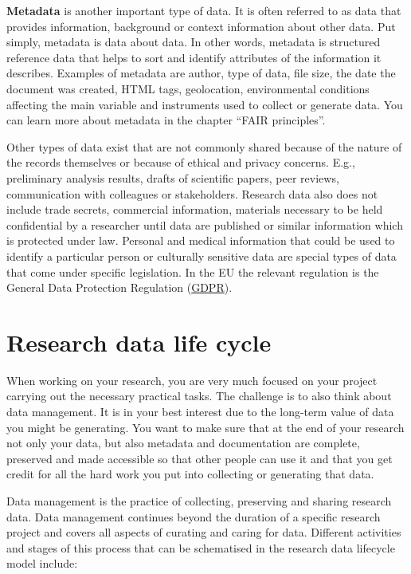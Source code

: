 \documentclass[
]{book}
\begin{document}
\textbf{Metadata} is another important type of data. It is often referred to as data that provides information, background or context information about other data. Put simply, metadata is data about data. In other words, metadata is structured reference data that helps to sort and identify attributes of the information it describes. Examples of metadata are author, type of data, file size, the date the document was created, HTML tags, geolocation, environmental conditions affecting the main variable and instruments used to collect or generate data. You can learn more about metadata in the chapter ``FAIR principles''.

Other types of data exist that are not commonly shared because of the nature of the records themselves or because of ethical and privacy concerns. E.g., preliminary analysis results, drafts of scientific papers, peer reviews, communication with colleagues or stakeholders. Research data also does not include trade secrets, commercial information, materials necessary to be held confidential by a researcher until data are published or similar information which is protected under law. Personal and medical information that could be used to identify a particular person or culturally sensitive data are special types of data that come under specific legislation. In the EU the relevant regulation is the General Data Protection Regulation (\href{https://gdpr-info.eu/}{GDPR}).

\hypertarget{research-data-life-cycle}{%
\section{Research data life cycle}\label{research-data-life-cycle}}

When working on your research, you are very much focused on your project carrying out the necessary practical tasks. The challenge is to also think about data management. It is in your best interest due to the long-term value of data you might be generating. You want to make sure that at the end of your research not only your data, but also metadata and documentation are complete, preserved and made accessible so that other people can use it and that you get credit for all the hard work you put into collecting or generating that data.

Data management is the practice of collecting, preserving and sharing research data. Data management continues beyond the duration of a specific research project and covers all aspects of curating and caring for data. Different activities and stages of this process that can be schematised in the research data lifecycle model include:
\end{document}
